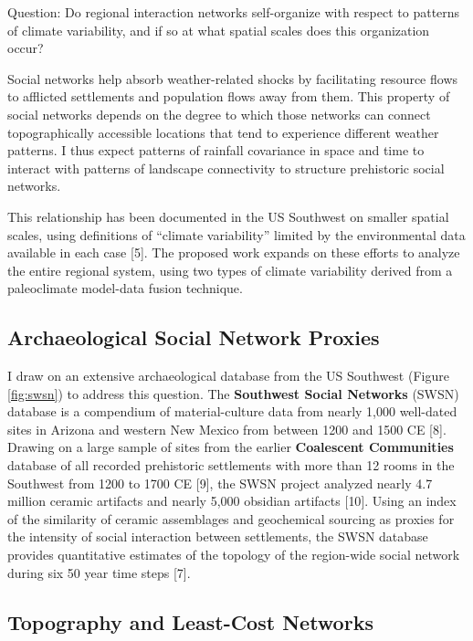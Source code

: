 \documentclass[10pt,letterpaper]{article}
\begin{document}
Question: Do regional interaction networks self-organize with respect to
patterns of climate variability, and if so at what spatial scales does
this organization occur?

Social networks help absorb weather-related shocks by facilitating
resource flows to afflicted settlements and population flows away from
them. This property of social networks depends on the degree to which
those networks can connect topographically accessible locations that
tend to experience different weather patterns. I thus expect patterns of
rainfall covariance in space and time to interact with patterns of
landscape connectivity to structure prehistoric social networks.

This relationship has been documented in the US Southwest on smaller
spatial scales, using definitions of ``climate variability'' limited by
the environmental data available in each case {[}5{]}. The proposed work
expands on these efforts to analyze the entire regional system, using
two types of climate variability derived from a paleoclimate model-data
fusion technique.

\subsection{Archaeological Social Network
Proxies}\label{archaeological-social-network-proxies}

I draw on an extensive archaeological database from the US Southwest
(Figure \ref{fig:swsn}) to address this question. The \textbf{Southwest
Social Networks} (SWSN) database is a compendium of material-culture
data from nearly 1,000 well-dated sites in Arizona and western New
Mexico from between 1200 and 1500 CE {[}8{]}. Drawing on a large sample
of sites from the earlier \textbf{Coalescent Communities} database of
all recorded prehistoric settlements with more than 12 rooms in the
Southwest from 1200 to 1700 CE {[}9{]}, the SWSN project analyzed nearly
4.7 million ceramic artifacts and nearly 5,000 obsidian artifacts
{[}10{]}. Using an index of the similarity of ceramic assemblages and
geochemical sourcing as proxies for the intensity of social interaction
between settlements, the SWSN database provides quantitative estimates
of the topology of the region-wide social network during six 50 year
time steps {[}7{]}.

\subsection{Topography and Least-Cost
Networks}\label{topography-and-least-cost-networks}
\end{document}
